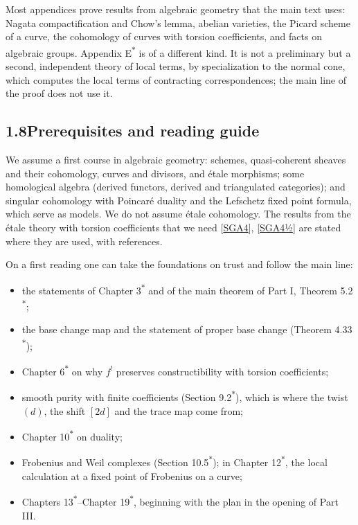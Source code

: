 \documentclass[11pt]{article}
\newcommand{\bpout}[1]{#1\textsuperscript{\hyperlink{bp-outside}{\ensuremath{\ast}}}}
\begin{document}
Most appendices prove results from algebraic geometry that the main text uses: Nagata compactification and Chow's lemma, abelian varieties, the Picard scheme of a curve, the cohomology of curves with torsion coefficients, and facts on algebraic groups. Appendix \bpout{E} is of a different kind. It is not a preliminary but a second, independent theory of local terms, by specialization to the normal cone, which computes the local terms of contracting correspondences; the main line of the proof does not use it.


\subsection*{\texorpdfstring{1.8\quad Prerequisites and reading guide}{1.8 Prerequisites and reading guide}}
\label{bp17}%
\label{bp18}%
We assume a first course in algebraic geometry: schemes, quasi-coherent sheaves and their cohomology, curves and divisors, and étale morphisms; some homological algebra (derived functors, derived and triangulated categories); and singular cohomology with Poincaré duality and the Lefschetz fixed point formula, which serve as models. We do not assume étale cohomology. The results from the étale theory with torsion coefficients that we need [\hyperref[bp26]{SGA4}], [\hyperref[bp33]{SGA4½}] are stated where they are used, with references.

On a first reading one can take the foundations on trust and follow the main line:

\begin{itemize}
\item the statements of Chapter \bpout{3} and of the main theorem of Part I, Theorem \bpout{5.2};
\item the base change map and the statement of proper base change (Theorem \bpout{4.33});
\item Chapter \bpout{6} on why \(f^!\) preserves constructibility with torsion coefficients;
\item smooth purity with finite coefficients (Section \bpout{9.2}), which is where the twist \((d)\), the shift \([2d]\) and the trace map come from;
\item Chapter \bpout{10} on duality;
\item Frobenius and Weil complexes (Section \bpout{10.5}); in Chapter \bpout{12}, the local calculation at a fixed point of Frobenius on a curve;
\item Chapters \bpout{13}–\bpout{Chapter 19}, beginning with the plan in the opening of Part III.
\end{itemize}
\end{document}
